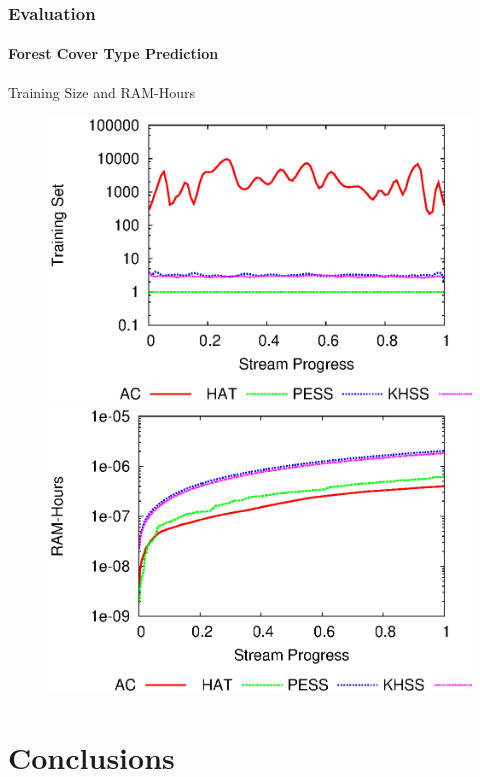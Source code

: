 \documentclass[14pt]{beamer}
\begin{document}
\begin{frame}
\frametitle{Evaluation}
\framesubtitle{Forest Cover Type Prediction}
Training Size and RAM-Hours
\begin{figure}[htp!]
\centering
\includegraphics[scale=0.41]{covtype_window.eps}
\includegraphics[scale=0.41]{covtype_ramhours.eps}
\end{figure}

\end{frame}

\section{Conclusions}
\end{document}
